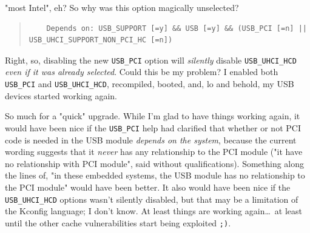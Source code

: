 \documentclass{article}
\begin{document}
"most Intel", eh?  So why was this option magically unselected?
\begin{quote}
\begin{verbatim}
	Depends on: USB_SUPPORT [=y] && USB [=y] && (USB_PCI [=n] || USB_UHCI_SUPPORT_NON_PCI_HC [=n])
\end{verbatim}
\end{quote}
Right, so, disabling the new \texttt{USB_PCI} option will \textit{silently} disable \texttt{USB_UHCI_HCD} \textit{even if it was already selected}.  Could this be my problem?  I enabled both \texttt{USB_PCI} and \texttt{USB_UHCI_HCD}, recompiled, booted, and, lo and behold, my USB devices started working again.

So much for a "quick" upgrade.  While I'm glad to have things working again, it would have been nice if the \texttt{USB_PCI} help had clarified that whether or not PCI code is needed in the USB module \textit{depends on the system}, because the current wording suggests that it \textit{never} has any relationship to the PCI module ("it have no relationship with PCI module", said without qualifications).  Something along the lines of, "in these embedded systems, the USB module has no relationship to the PCI module" would have been better.  It also would have been nice if the \texttt{USB_UHCI_HCD} options wasn't silently disabled, but that may be a limitation of the Kconfig language; I don't know.  At least things are working again\ldots~at least until the other cache vulnerabilities start being exploited \texttt{;)}.


\end{document}

